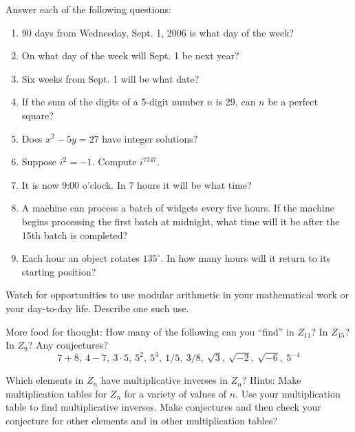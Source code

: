 \documentclass[space,nooutcomes]{ximera}
\begin{document}
\begin{problem}
Answer each of the following questions: 
\begin{enumerate}
\item 90 days from Wednesday, Sept. 1, 2006 is what day of the week?
\item On what day of the week will Sept. 1 be next year?
\item Six weeks from Sept. 1 will be what date?
\item If the sum of the digits of a 5-digit number $n$ is 29, can $n$ be a perfect square?
\item Does $x^2 - 5y = 27$ have integer solutions?
\item Suppose $i^2 = -1$.  Compute $i^{7347}$.
\item It is now 9:00 o'clock.  In 7 hours it will be what time?
\item A machine can process a batch of widgets every five hours.  If the machine begins processing the first batch at midnight, what time will it be after the 15th batch is completed?
\item Each hour an object rotates $135^\circ$.  In how many hours will it return to its starting position?  
\end{enumerate}
\begin{freeResponse}
\end{freeResponse}
\end{problem}

\begin{problem}
Watch for opportunities to use modular arithmetic in your mathematical work or your day-to-day life.  Describe one such use.
\begin{freeResponse}
\end{freeResponse}
\end{problem}

\begin{problem}
More food for thought:  How many of the following can you ``find'' in $Z_{11}$? In $Z_15$? In $Z_9$?  Any conjectures? 
\[
7 + 8,\ 4 - 7,\ 3\cdot 5,\ 5^2,\ 5^3,\ 1/5,\ 3/8,\ \sqrt{3},\ \sqrt{-2},\ \sqrt{-6},\ 5^{-4} 
\]
\begin{freeResponse}
\end{freeResponse}
\end{problem}

\begin{problem}
Which elements in $Z_n$ have multiplicative inverses in $Z_n$?  
Hints:  Make multiplication tables for $Z_n$ for a variety of values of $n$.   Use your multiplication table to find multiplicative inverses.  Make conjectures and then check your conjecture for other elements and in other multiplication tables? 
\begin{freeResponse}
\end{freeResponse}
\end{problem}
\end{document}
